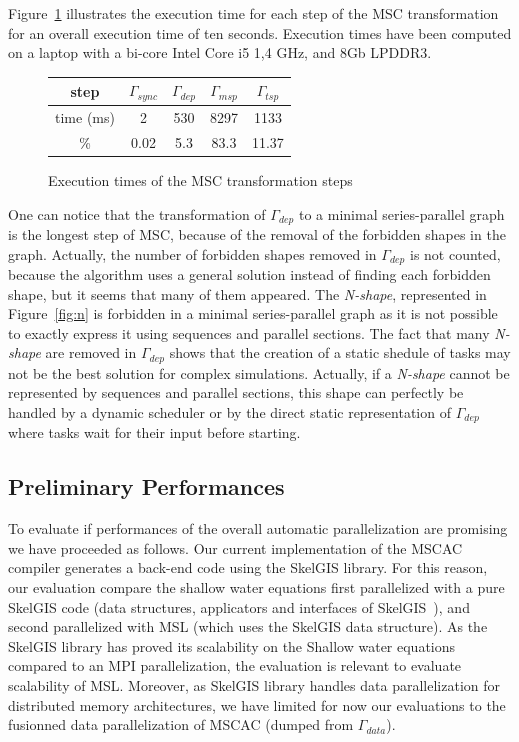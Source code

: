 Figure~\ref{fig:exectime} illustrates the execution time for each step of the MSC transformation for an overall execution time of ten seconds. Execution times have been computed on a laptop with a bi-core Intel Core i5 1,4 GHz, and 8Gb LPDDR3. 
\begin{figure}[!h]
 \begin{center}
 \begin{tabular}{c|c|c|c|c|}
   step & $\Gamma_{sync}$ & $\Gamma_{dep}$ & $\Gamma_{msp}$ & $\Gamma_{tsp}$\\
   \hline
   time (ms) & 2 & 530 & 8297 & 1133\\
   \hline
   \% & 0.02 & 5.3 & 83.3 & 11.37\\
 \end{tabular}
\caption{Execution times of the MSC transformation steps}
\label{fig:exectime}
 \end{center}
\end{figure}
One can notice that the transformation of $\Gamma_{dep}$ to a minimal series-parallel graph is the longest step of MSC, because of the removal of the forbidden shapes in the graph. Actually, the number of forbidden shapes removed in $\Gamma_{dep}$ is not counted, because the algorithm uses a general solution instead of finding each forbidden shape, but it seems that many of them appeared. The \emph{N-shape}, represented in Figure~\ref{fig:n} is forbidden in a minimal series-parallel graph as it is not possible to exactly express it using sequences and parallel sections.
The fact that many \emph{N-shape} are removed in $\Gamma_{dep}$ shows that the creation of a static shedule of tasks may not be the best solution for complex simulations. Actually, if a \emph{N-shape} cannot be represented by sequences and parallel sections, this shape can perfectly be handled by a dynamic scheduler or by the direct static representation of $\Gamma_{dep}$ where tasks wait for their input before starting.

\subsection*{Preliminary Performances}
To evaluate if performances of the overall automatic parallelization are promising we have proceeded as follows. Our current implementation of the MSCAC compiler generates a back-end code using the SkelGIS library. For this reason, our evaluation compare the shallow water equations first parallelized with a pure SkelGIS code (data structures, applicators and interfaces of SkelGIS~\cite{CPE:CPE3494}), and second parallelized with MSL (which uses the SkelGIS data structure). As the SkelGIS library has proved its scalability on the Shallow water equations compared to an MPI parallelization, the evaluation is relevant to evaluate scalability of MSL. 
Moreover, as SkelGIS library handles data parallelization for distributed memory architectures, we have limited for now our evaluations to the fusionned data parallelization of MSCAC (dumped from $\Gamma_{data}$). 

